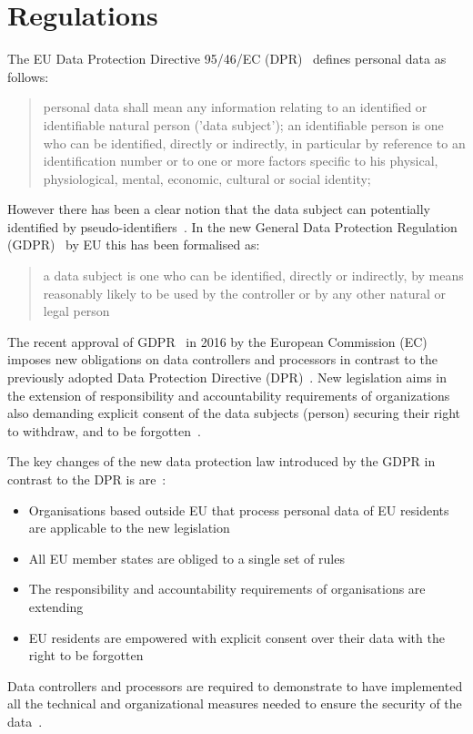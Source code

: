 \section{Regulations}\label{problem:regulations}

The EU Data Protection Directive 95/46/EC (DPR)~\cite{eu-46ec-1995} defines personal data as follows:
\blockquote{
personal data shall mean any information relating to an identified or identifiable natural person ('data subject'); an identifiable person is one who can be identified, directly or indirectly, in particular by reference to an identification number or to one or more factors specific to his physical, physiological, mental, economic, cultural or social identity;
}
However there has been a clear notion that the data subject can potentially identified by pseudo-identifiers~\cite{pii}.
In the new General Data Protection Regulation (GDPR)~\cite{gdpr} by EU this has been formalised as:
\blockquote{
a data subject is one who can be identified, directly or indirectly, by means reasonably likely to be used by the controller or by any other natural or legal person
}

The recent approval of GDPR~\cite{gdpr} in 2016 by the European Commission (EC)
imposes new obligations on data controllers and processors in contrast to the previously adopted Data Protection Directive (DPR)~\cite{eu-46ec-1995}.
New legislation aims in the extension of responsibility and accountability requirements of organizations also demanding explicit
consent of the data subjects (person) securing their right to withdraw, and to be forgotten~\cite{DBLP:journals/corr/NeisseSF17}.

The key changes of the new data protection law introduced by the GDPR in contrast to the DPR is are~\cite{DBLP:journals/corr/NeisseSF17}:
\begin{itemize}
    \item Organisations based outside EU that process personal data of EU residents are applicable to the new legislation
    \item All EU member states are obliged to a single set of rules
    \item The responsibility and accountability requirements of organisations are extending
    \item EU residents are empowered with explicit consent over their data with the right to be forgotten
\end{itemize}

Data controllers and processors are required to demonstrate to have implemented all the technical and organizational measures needed to ensure the security of the data~\cite{mhmd}.

